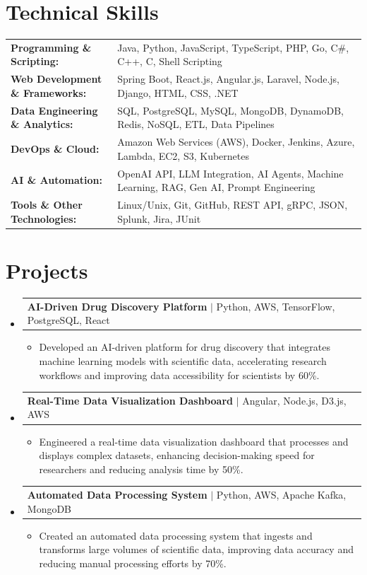 \documentclass[letterpaper,10pt]{article}
\makeatletter
\newcommand{\resumeItem}[1]{
  \item{\fontsize{8pt}{9pt}\selectfont
    #1 \vspace{-3pt}
  }
}
\newcommand{\resumeProjectHeading}[2]{
    \item
    \begin{tabular*}{1.001\textwidth}{l@{\extracolsep{\fill}}r}
      \fontsize{8.5pt}{10pt}#1 & \textbf{\fontsize{8.5pt}{10pt} #2}\\
    \end{tabular*}\vspace{-7pt}
}
\newcommand{\resumeSubHeadingListStart}{\begin{itemize}[leftmargin=0pt, label={}]}
\newcommand{\resumeSubHeadingListEnd}{\end{itemize}}
\newcommand{\resumeItemListStart}{\begin{itemize}[leftmargin=*]}
\newcommand{\resumeItemListEnd}{\end{itemize}\vspace{-5pt}}
\makeatother
\begin{document}
\section{Technical Skills}
        \vspace{-14pt}
        \begin{table}[h]
            \fontsize{8pt}{9pt}\selectfont
            \begin{tabular}{p{0.3\linewidth} p{0.7\linewidth}}
                \textbf{Programming \& Scripting:} & Java, Python, JavaScript, TypeScript, PHP, Go, C\#, C++, C, Shell Scripting \\
                \textbf{Web Development \& Frameworks:} & Spring Boot, React.js, Angular.js, Laravel, Node.js, Django, HTML, CSS, .NET \\
                \textbf{Data Engineering \& Analytics:} & SQL, PostgreSQL, MySQL, MongoDB, DynamoDB, Redis, NoSQL, ETL, Data Pipelines \\
                \textbf{DevOps \& Cloud:} & Amazon Web Services (AWS), Docker, Jenkins, Azure, Lambda, EC2, S3, Kubernetes \\
                \textbf{AI \& Automation:} & OpenAI API, LLM Integration, AI Agents, Machine Learning, RAG, Gen AI, Prompt Engineering \\
                \textbf{Tools \& Other Technologies:} & Linux/Unix, Git, GitHub, REST API, gRPC, JSON, Splunk, Jira, JUnit \\
            \end{tabular}
        \end{table}
 \vspace{-18pt}

\section{Projects}
    \vspace{-5pt}
    \resumeSubHeadingListStart
          \resumeProjectHeading
            {\textbf{AI-Driven Drug Discovery Platform} $|$ Python, AWS, TensorFlow, PostgreSQL, React}{}
            \resumeItemListStart
                \resumeItem{Developed an AI-driven platform for drug discovery that integrates machine learning models with scientific data, accelerating research workflows and improving data accessibility for scientists by 60\%.}
            \resumeItemListEnd
        \vspace{-12pt}
    
        \resumeProjectHeading
            {\textbf{Real-Time Data Visualization Dashboard} $|$ Angular, Node.js, D3.js, AWS}{}
        \resumeItemListStart
                \resumeItem{Engineered a real-time data visualization dashboard that processes and displays complex datasets, enhancing decision-making speed for researchers and reducing analysis time by 50\%.}
        \resumeItemListEnd
      \vspace{-12pt}
      \resumeProjectHeading
        {\textbf{Automated Data Processing System} $|$ Python, AWS, Apache Kafka, MongoDB}{}
    \resumeItemListStart
            \resumeItem{Created an automated data processing system that ingests and transforms large volumes of scientific data, improving data accuracy and reducing manual processing efforts by 70\%.}
    \resumeItemListEnd
    \resumeSubHeadingListEnd
\end{document}
